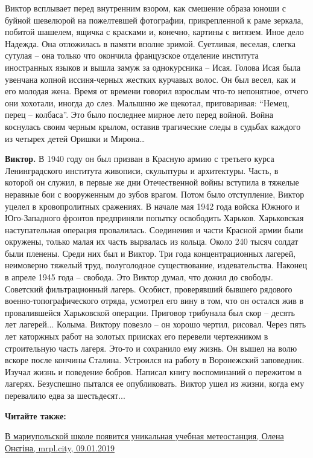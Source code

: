 Виктор всплывает перед внутренним взором, как смешение образа юноши с буйной
шевелюрой на пожелтевшей фотографии, прикрепленной к раме зеркала, побитой
шашелем, ящичка с красками и, конечно, картины с витязем. Иное дело Надежда.
Она отложилась в памяти вполне зримой. Суетливая, веселая, слегка сутулая – она
только что окончила французское отделение института иностранных языков и вышла
замуж за однокурсника – Исая. Голова Исая была увенчана копной иссиня-черных
жестких курчавых волос. Он был весел, как и его молодая жена. Время от времени
говорил взрослым что-то непонятное, отчего они хохотали, иногда до слез.
Малышню же щекотал, приговаривая: \enquote{Немец, перец – колбаса}. Это было последнее
мирное лето перед войной. Война коснулась своим черным крылом, оставив
трагические следы в судьбах каждого из четырех детей Оришки и Мирона…

\textbf{Виктор.} В 1940 году он был призван в Красную армию с третьего курса
Ленинградского института живописи, скульптуры и архитектуры. Часть, в которой
он служил, в первые же дни Отечественной войны вступила в тяжелые неравные бои
с вооруженным до зубов врагом. Потом было отступление, Виктор уцелел в
кровопролитных сражениях. В начале мая 1942 года войска Южного и Юго-Западного
фронтов предприняли попытку освободить Харьков. Харьковская наступательная
операция провалилась. Соединения и части Красной армии были окружены, только
малая их часть вырвалась из кольца. Около 240 тысяч солдат были пленены. Среди
них был и Виктор. Три года концентрационных лагерей, неимоверно тяжелый труд,
полуголодное существование, издевательства. Наконец в апреле 1945 года –
свобода. Это Виктор думал, что дожил до свободы. Советский фильтрационный
лагерь. Особист, проверявший бывшего рядового военно-топографического отряда,
усмотрел его вину в том, что он остался жив в провалившейся Харьковской
операции. Приговор трибунала был скор – десять лет лагерей... Колыма. Виктору
повезло – он хорошо чертил, рисовал. Через пять лет каторжных работ на золотых
приисках его перевели чертежником в строительную часть лагеря. Это-то и
сохранило ему жизнь. Он вышел на волю вскоре после кончины Сталина. Устроился
на работу в Воронежский заповедник. Изучал жизнь и поведение бобров. Написал
книгу воспоминаний о пережитом в лагерях. Безуспешно пытался ее опубликовать.
Виктор ушел из жизни, когда ему перевалило едва за шестьдесят...

\textbf{Читайте также:} 

\href{https://mrpl.city/news/view/v-mariupolskoj-shkole-poyavitsya-unikalnaya-uchebnaya-meteostantsiya}{%
В мариупольской школе появится уникальная учебная метеостанция, Олена Онєгіна, mrpl.city, 09.01.2019}

